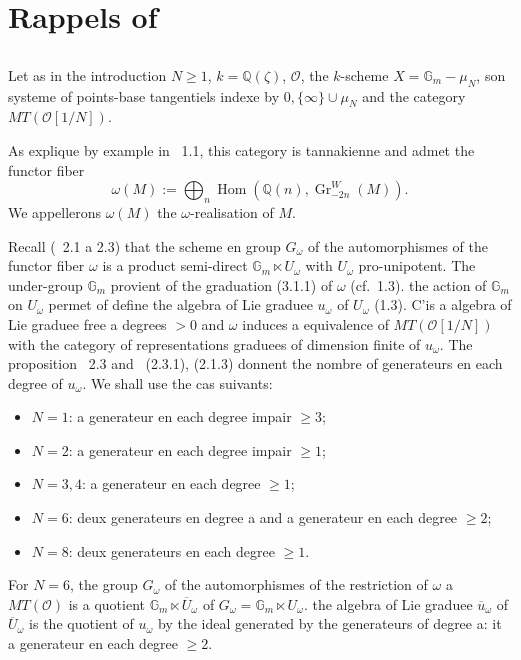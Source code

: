 \documentclass[11pt,a4paper]{article}
\theoremstyle{plain}
\theoremstyle{definition}
\DeclareMathOperator{\Hom}{Hom}
\newcommand{\Gm}{\mathbb{G}_m}
\newcommand{\Q}{\mathbb{Q}}
\newcommand{\Gr}{\operatorname{Gr}}
\begin{document}
\section{Rappels of \cite{1}}
\label{sec:3}

\subsection{}
Let as in the introduction $N \geq 1$, $k = \Q(\zeta)$, $\mathcal{O}$, the $k$-scheme $X = \Gm - \mu_N$, son systeme of points-base tangentiels indexe by $0, \{\infty\} \cup \mu_N$ and the category $MT(\mathcal{O}[1/N])$.

As explique by example in \cite{1}~1.1, this category is tannakienne and admet the functor fiber
\begin{equation}\label{eq:3.1.1}
\omega(M) := \bigoplus_n \Hom(\Q(n), \Gr^W_{-2n}(M)).
\end{equation}
We appellerons $\omega(M)$ the $\omega$-realisation of $M$.

Recall (\cite{1}~2.1 a 2.3) that the scheme en group $G_\omega$ of the automorphismes of the functor fiber $\omega$ is a product semi-direct $\Gm \ltimes U_\omega$ with $U_\omega$ pro-unipotent. The under-group $\Gm$ provient of the graduation (3.1.1) of $\omega$ (cf.~1.3). the action of $\Gm$ on $U_\omega$ permet of define the algebra of Lie graduee $u_\omega$ of $U_\omega$ (1.3). C'is a algebra of Lie graduee free a degrees $> 0$ and $\omega$ induces a equivalence of $MT(\mathcal{O}[1/N])$ with the category of representations graduees of dimension finite of $u_\omega$. The proposition \cite{1}~2.3 and \cite{1}~(2.3.1), (2.1.3) donnent the nombre of generateurs en each degree of $u_\omega$. We shall use the cas suivants:

\begin{itemize}[leftmargin=2em]
\item $N=1$: a generateur en each degree impair $\geq 3$;
\item $N=2$: a generateur en each degree impair $\geq 1$;
\item $N=3,4$: a generateur en each degree $\geq 1$;
\item $N=6$: deux generateurs en degree a and a generateur en each degree $\geq 2$;
\item $N=8$: deux generateurs en each degree $\geq 1$.
\end{itemize}

For $N=6$, the group $G_\omega$ of the automorphismes of the restriction of $\omega$ a $MT(\mathcal{O})$ is a quotient $\Gm \ltimes \overline{U}_\omega$ of $G_\omega = \Gm \ltimes U_\omega$. the algebra of Lie graduee $\overline{u}_\omega$ of $\overline{U}_\omega$ is the quotient of $u_\omega$ by the ideal generated by the generateurs of degree a: it a generateur en each degree $\geq 2$.
\end{document}

